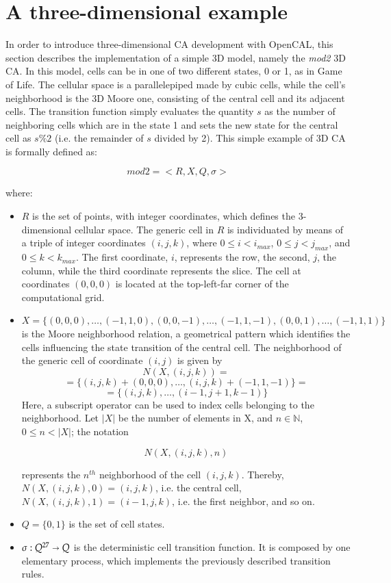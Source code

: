 \section{A three-dimensional example}\label{sec:mod2}

In order to introduce three-dimensional CA development with OpenCAL,
this section describes the implementation of a simple 3D model, namely
the \emph{mod2} 3D CA. In this model, cells can be in one of two
different states, 0 or 1, as in Game of Life. The cellular space is a
parallelepiped made by cubic cells, while the cell's neighborhood is
the 3D Moore one, consisting of the central cell and its adjacent
cells. The transition function simply evaluates the quantity $s$ as
the number of neighboring cells which are in the state 1 and sets the
new state for the central cell as $s\%2$ (i.e. the remainder of $s$
divided by 2). This simple example of 3D CA is formally defined as:

$$mod2 = < R, X, Q, \sigma >$$

where:

\begin{itemize}

\item $R$ is the set of points, with integer coordinates, which
  defines the 3-dimensional cellular space. The generic cell in $R$ is
  individuated by means of a triple of integer coordinates $(i, j,
  k)$, where $0 \leq i < i_{max}$, $0 \leq j < j_{max}$, and $0 \leq k
  < k_{max}$. The first coordinate, $i$, represents the row, the
  second, $j$, the column, while the third coordinate represents the
  slice. The cell at coordinates $(0,0,0)$ is located at the
  top-left-far corner of the computational grid.

\item $X = \{(0,0,0), \dots, (-1,1,0), (0,0,-1), \dots, (-1,1,-1),
  (0,0,1), \dots, (-1,1,1)\}$ is the Moore neighborhood
  relation, a geometrical pattern which identifies the cells
  influencing the state transition of the central cell. The
  neighborhood of the generic cell of coordinate $(i, j)$ is given by
  $$N(X, (i, j, k)) = $$
  $$= \{(i, j, k)+(0,0,0), \dots, (i, j, k)+(-1,1,-1)\} =$$
  $$= \{(i, j, k), \dots, (i-1,j+1,k-1)\}$$
  Here, a subscript operator can be used to index cells belonging to the
  neighborhood. Let $|X|$ be the number of elements in X, and $n \in
  \mathbb{N}$, $0 \leq n < |X|$; the notation

  $$N(X, (i, j, k), n)$$

  represents the $n^{th}$ neighborhood of the cell $(i,j,k)$. Thereby,
  $N(X, (i, j, k), 0) = (i, j, k)$, i.e. the central cell, $N(X, (i, j, k), 1)
  = (i-1, j, k)$, i.e. the first neighbor, and so on.

\item $Q = \{0, 1\}$ is the set of cell states.

\item $\sigma : Q^{27} \shortrightarrow Q$ is the deterministic cell
  transition function. It is composed by one elementary process, which
  implements the previously described transition rules.
\end{itemize}


